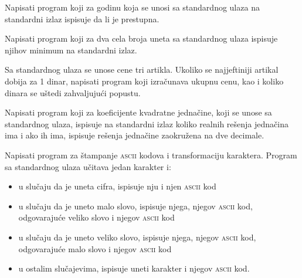 \begin{Exercise}[label=v1.2_04] 
 Napisati program koji za godinu koja se unosi sa standardnog ulaza na standardni izlaz
  ispisuje da li je prestupna.
\end{Exercise}
\begin{Answer}[ref=v1.2_04]
\end{Answer}

\begin{Exercise}[label=v1.2_05] 
Napisati program koji za dva cela broja uneta sa standardnog ulaza 
  ispisuje njihov minimum na standardni izlaz. 
\end{Exercise}
\begin{Answer}[ref=v1.2_05]
\end{Answer}

\begin{Exercise}[label=v1.2_06] 
Sa standardnog ulaza se unose cene tri artikla. Ukoliko se najjeftiniji
  artikal dobija za 1 dinar, napisati program koji izračunava ukupnu cenu, kao i koliko
  dinara se uštedi zahvaljujući popustu.  
\end{Exercise}
\begin{Answer}[ref=v1.2_06]
\end{Answer}

\begin{Exercise}[label=v1.2_07] 
Napisati program koji za koeficijente kvadratne jednačine,
koji se unose sa standardnog ulaza, 
ispisuje na standardni izlaz koliko realnih rešenja jednačina ima i ako ih ima, ispisuje rešenja jednačine
zaokružena na dve decimale.
\end{Exercise}
\begin{Answer}[ref=v1.2_07]
\end{Answer}

\begin{Exercise}[label=v1.2_08] 
Napisati program za štampanje \textsc{ascii} kodova i transformaciju karaktera. Program sa standardnog ulaza učitava jedan karakter i:
\begin{itemize}
\item{u slučaju da je uneta cifra, ispisuje nju i njen \textsc{ascii} kod} 
\item{u slučaju da je uneto malo slovo, ispisuje njega, njegov \textsc{ascii} kod, odgovarajuće veliko slovo i njegov \textsc{ascii} kod}
\item{u slučaju da je uneto veliko slovo, ispisuje njega, njegov \textsc{ascii} kod, odgovarajuće malo slovo i njegov \textsc{ascii} kod}
\item{u ostalim slučajevima, ispisuje uneti karakter i njegov \textsc{ascii} kod.} 
\end{itemize}
\end{Exercise}
\begin{Answer}[ref=v1.2_08]
\end{Answer}

